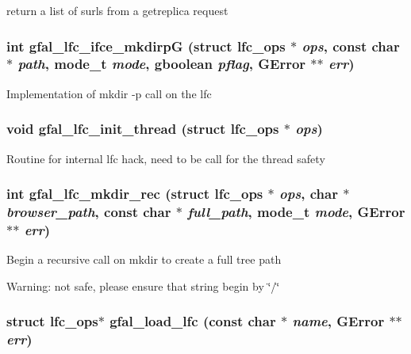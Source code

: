return a list of surls from a getreplica request 
\subsubsection{\setlength{\rightskip}{0pt plus 5cm}int gfal\_\-lfc\_\-ifce\_\-mkdirp\-G (struct lfc\_\-ops $\ast$ {\em ops}, const char $\ast$ {\em path}, mode\_\-t {\em mode}, gboolean {\em pflag}, GError $\ast$$\ast$ {\em err})}\label{lfc__ifce__ng_8c_9fa43925882e2e196e0020b529827d3c}


Implementation of mkdir -p call on the lfc 
\subsubsection{\setlength{\rightskip}{0pt plus 5cm}void gfal\_\-lfc\_\-init\_\-thread (struct lfc\_\-ops $\ast$ {\em ops})}\label{lfc__ifce__ng_8c_aed5d8ab4c88e918990444e53930bfa4}


Routine for internal lfc hack, need to be call for the thread safety 
\subsubsection{\setlength{\rightskip}{0pt plus 5cm}int gfal\_\-lfc\_\-mkdir\_\-rec (struct lfc\_\-ops $\ast$ {\em ops}, char $\ast$ {\em browser\_\-path}, const char $\ast$ {\em full\_\-path}, mode\_\-t {\em mode}, GError $\ast$$\ast$ {\em err})}\label{lfc__ifce__ng_8c_0d7c361d951ac79fee504d5125485033}


Begin a recursive call on mkdir to create a full tree path \begin{Desc}
\item[Warning:]not safe, please ensure that string begin by \char`\"{}/\char`\"{} \end{Desc}
\subsubsection{\setlength{\rightskip}{0pt plus 5cm}struct lfc\_\-ops$\ast$ gfal\_\-load\_\-lfc (const char $\ast$ {\em name}, GError $\ast$$\ast$ {\em err})}\label{lfc__ifce__ng_8c_7c91643749a2c5d7e8043c0e42d00fd6}


